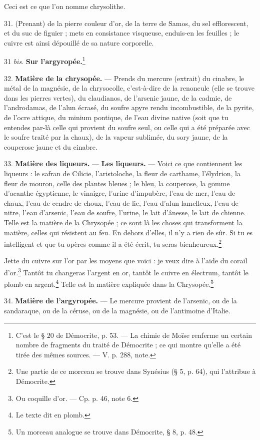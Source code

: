 \documentclass[a4paper, 11pt, oneside, polutonikogreek, french]{article}
\begin{document}
Ceci est ce que l'on nomme chrysolithe.

31. (Prenant) de la pierre couleur d'or, de la terre de Samos, du sel efflorescent, et du suc de figuier ; mets en consistance visqueuse, enduis-en les feuilles ; le cuivre est ainsi dépouillé de sa nature corporelle.

31 \emph{bis}. \textbf{Sur l'argyropée.}\footnote{C'est le § 20 de Démocrite, p. 53. --- La chimie de Moïse renferme un certain nombre de fragments du traité de Démocrite ; ce qui montre qu'elle a été tirée des mêmes sources. --- V. p. 288, note.}

32. \textbf{Matière de la chrysopée.} --- Prends du mercure (extrait) du cinabre, le métal de la magnésie, de la chrysocolle, c'est-à-dire de la renoncule (elle se trouve dans les pierres vertes), du claudianos, de l'arsenic jaune, de la cadmie, de l'androdamas, de l'alun écrasé, du soufre apyre rendu incombustible, de la pyrite, de l'ocre attique, du minium pontique, de l'eau divine native (soit que tu entendes par-là celle qui provient du soufre seul, ou celle qui a été préparée avec le soufre traité par la chaux), de la vapeur sublimée, du sory jaune, de la couperose jaune et du cinabre.

33. \textbf{Matière des liqueurs.} --- \textbf{Les liqueurs.} --- Voici ce que contiennent les liqueurs : le safran de Cilicie, l'aristoloche, la fleur de carthame, l'élydrion, la fleur de mouron, celle des plantes bleues ; le bleu, la couperose, la gomme d'acanthe égyptienne, le vinaigre, l'urine d'impubère, l'eau de mer, l'eau de chaux, l'eau de cendre de choux, l'eau de lie, l'eau d'alun lamelleux, l'eau de nitre, l'eau d'arsenic, l'eau de soufre, l'urine, le lait d'ânesse, le lait de chienne. Telle est la matière de la Chrysopée ; ce sont là les choses qui transforment la matière, celles qui résistent au feu. En dehors d'elles, il n'y a rien de sûr. Si tu es intelligent et que tu opères comme il a été écrit, tu seras bienheureux.\footnote{Une partie de ce morceau se trouve dans Synésius (§ 5, p. 64), qui l'attribue à Démocrite.}

Jette du cuivre sur l'or par les moyens que voici : je veux dire à l'aide du corail d'or.\footnote{Ou coquille d'or. --- Cp. p. 46, note 6.} Tantôt tu changeras l'argent en or, tantôt le cuivre en électrum, tantôt le plomb en argent.\footnote{Le texte dit en plomb.} Telle est la matière expliquée dans la Chrysopée.\footnote{Un morceau analogue se trouve dans Démocrite, § 8, p. 48.}

34. \textbf{Matière de l'argyropée.} --- Le mercure provient de l'arsenic, ou de la sandaraque, ou de la céruse, ou de la magnésie, ou de l'antimoine d'Italie.
\end{document}
